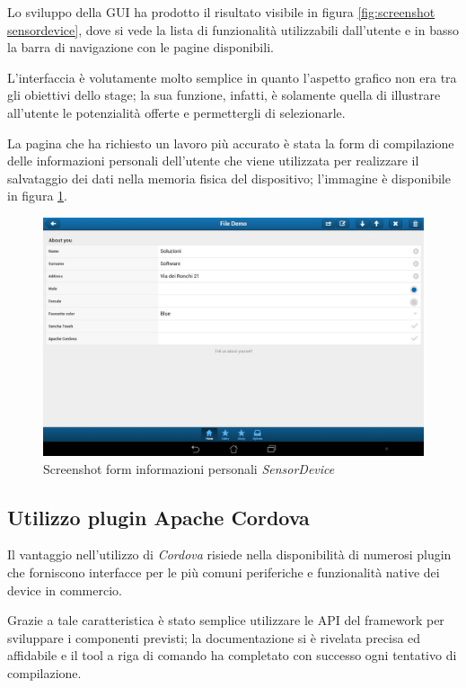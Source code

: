 Lo sviluppo della \ac{GUI} ha prodotto il risultato visibile in figura \ref{fig:screenshot sensordevice}, dove si vede la lista di funzionalità utilizzabili dall'utente e in basso la barra di navigazione con le pagine disponibili.

L'interfaccia è volutamente molto semplice in quanto l'aspetto grafico non era tra gli obiettivi dello stage; la sua funzione, infatti, è solamente quella di illustrare all'utente le potenzialità offerte e permettergli di selezionarle.

La pagina che ha richiesto un lavoro più accurato è stata la form di compilazione delle informazioni personali dell'utente che viene utilizzata per realizzare il salvataggio dei dati nella memoria fisica del dispositivo; l'immagine è disponibile in figura \ref{fig:screenshot file sensordevice}.

\begin{figure}[htb]
\centering
\includegraphics[scale=0.25]{gfx/screenshot/screen_file_sensorDevice}
\caption{Screenshot form informazioni personali \emph{SensorDevice}}
\label{fig:screenshot file sensordevice}
\end{figure}

\subsection{Utilizzo plugin Apache Cordova}
Il vantaggio nell'utilizzo di \emph{Cordova} risiede nella disponibilità di numerosi plugin che forniscono interfacce per le più comuni periferiche e funzionalità native dei device in commercio.

Grazie a tale caratteristica è stato semplice utilizzare le \ac{API} del framework per sviluppare i componenti previsti; la documentazione si è rivelata precisa ed affidabile e il tool a riga di comando ha completato con successo ogni tentativo di compilazione.

